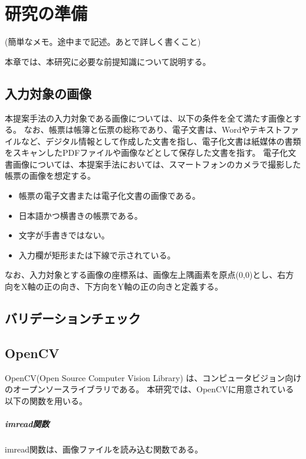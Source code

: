 \chapter{研究の準備}\label{cha:Preparation}
(簡単なメモ。途中まで記述。あとで詳しく書くこと)

本章では、本研究に必要な前提知識について説明する。


\section{入力対象の画像}\label{sec:input_images}
本提案手法の入力対象である画像については、以下の条件を全て満たす画像とする。
なお、帳票は帳簿と伝票の総称であり\cite{帳票}、電子文書は、Wordやテキストファイルなど、デジタル情報として作成した文書を指し、電子化文書は紙媒体の書類をスキャンしたPDFファイルや画像などとして保存した文書を指す\cite{電子文書と電子化文書}。
電子化文書画像については、本提案手法においては、スマートフォンのカメラで撮影した帳票の画像を想定する。

\begin{itemize}
  \item 帳票の電子文書または電子化文書の画像である。
  \item 日本語かつ横書きの帳票である。
  \item 文字が手書きではない。
  \item 入力欄が矩形または下線で示されている。
\end{itemize}

なお、入力対象とする画像の座標系は、画像左上隅画素を原点(0,0)とし、右方向をX軸の正の向き、下方向をY軸の正の向きと定義する。

\section{バリデーションチェック}\label{sec:validation_check}


\section{OpenCV}\label{sec:OpenCV}
OpenCV(Open Source Computer Vision Library) は、コンピュータビジョン向けのオープンソースライブラリである\cite{OpenCV}。
本研究では、OpenCVに用意されている以下の関数を用いる。

\paragraph{imread関数}
imread関数は、画像ファイルを読み込む関数である。

